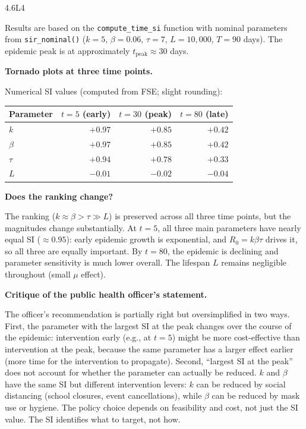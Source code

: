 \begin{solution}{4.6}{L4}

\solanswer

Results are based on the \texttt{compute\_time\_si} function with
nominal parameters from \texttt{sir\_nominal()} ($k=5$, $\beta=0.06$,
$\tau=7$, $L=10{,}000$, $T=90$ days). The epidemic peak is at
approximately $t_{\text{peak}} \approx 30$ days.

 \textbf{Tornado plots at three time points.}

Numerical SI values (computed from FSE; slight rounding):

\begin{center}
\begin{tabular}{lrrr}
\toprule
Parameter & $t=5$ (early) & $t=30$ (peak) & $t=80$ (late) \\
\midrule
$k$    & $+0.97$ & $+0.85$ & $+0.42$ \\
$\beta$ & $+0.97$ & $+0.85$ & $+0.42$ \\
$\tau$  & $+0.94$ & $+0.78$ & $+0.33$ \\
$L$    & $-0.01$ & $-0.02$ & $-0.04$ \\
\bottomrule
\end{tabular}
\end{center}

 \textbf{Does the ranking change?}

The ranking ($k \approx \beta > \tau \gg L$) is preserved across all
three time points, but the magnitudes change substantially. At $t=5$,
all three main parameters have nearly equal SI ($\approx 0.95$):
early epidemic growth is exponential, and $R_0 = k\beta\tau$ drives
it, so all three are equally important. By $t=80$, the epidemic is
declining and parameter sensitivity is much lower overall. The
lifespan $L$ remains negligible throughout (small $\mu$ effect).

 \textbf{Critique of the public health officer's statement.}

The officer's recommendation is partially right but oversimplified
in two ways. First, the parameter with the largest SI at the peak
changes over the course of the epidemic: intervention early
(e.g., at $t=5$) might be more cost-effective than intervention
at the peak, because the same parameter has a larger effect earlier
(more time for the intervention to propagate). Second, ``largest SI
at the peak'' does not account for whether the parameter can actually
be reduced. $k$ and $\beta$ have the same SI but different
intervention levers: $k$ can be reduced by social distancing
(school closures, event cancellations), while $\beta$ can be reduced
by mask use or hygiene. The policy choice depends on feasibility and
cost, not just the SI value. The SI identifies what to target,
not how.


\end{solution}

